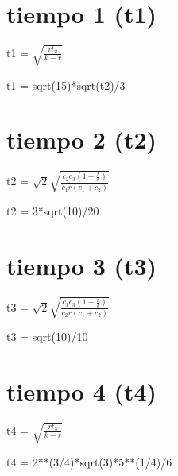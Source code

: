 \documentclass{article}
\newcommand*\rbreak{\par\noindent\linebreak}
\begin{document}
\section{\Huge tiempo 1 (t1)}
\begin{Huge}
t1 = $\sqrt{\frac{r t_{2}}{k - r}}$\rbreak\rbreak
t1 = sqrt(15)*sqrt(t2)/3
\end{Huge}
\section{\Huge tiempo 2 (t2)}
\begin{Huge}
t2 = $\sqrt{2} \sqrt{\frac{c_{2} c_{3} \left(1 - \frac{r}{k}\right)}{c_{1} r \left(c_{1} + c_{2}\right)}}$\rbreak\rbreak
t2 = 3*sqrt(10)/20
\end{Huge}
\section{\Huge tiempo 3 (t3)}
\begin{Huge}
t3 = $\sqrt{2} \sqrt{\frac{c_{1} c_{3} \left(1 - \frac{r}{k}\right)}{c_{2} r \left(c_{1} + c_{2}\right)}}$\rbreak\rbreak
t3 = sqrt(10)/10
\end{Huge}
\section{\Huge tiempo 4 (t4)}
\begin{Huge}
t4 = $\sqrt{\frac{r t_{3}}{k - r}}$\rbreak\rbreak
t4 = 2**(3/4)*sqrt(3)*5**(1/4)/6
\end{Huge}
\end{document}
